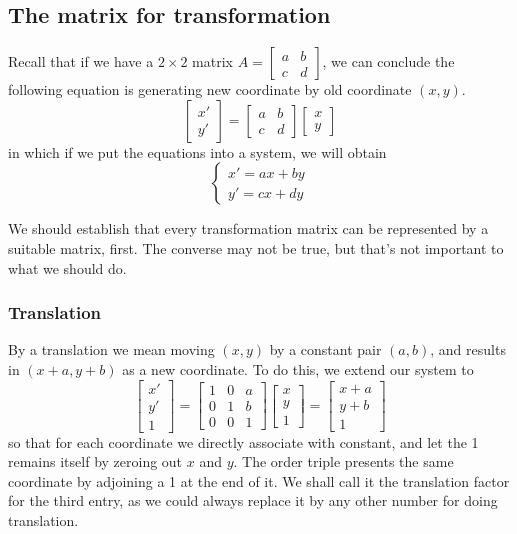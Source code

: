 \documentclass[12pt]{article}
\begin{document}
    \subsection*{The matrix for transformation}
    Recall that if we have a $2\times 2$ matrix $A=\begin{bmatrix}
        a&b\\c&d
    \end{bmatrix}$, we can conclude the following equation is generating new coordinate by old coordinate $(x,y)$. $$\begin{bmatrix}
        x'\\y'
    \end{bmatrix}=\begin{bmatrix}
        a&b\\c&d
    \end{bmatrix}\begin{bmatrix}
        x\\y
    \end{bmatrix}$$ in which if we put the equations into a system, we will obtain $$\begin{cases}
        x'=ax+by\\
        y'=cx+dy
    \end{cases}$$

    We should establish that every transformation matrix can be represented by a suitable matrix, first. The converse may not be true, but that's not important to what we should do.

    \subsubsection*{Translation}
    By a translation we mean moving $(x,y)$ by a constant pair $(a,b)$, and results in $(x+a,y+b)$ as a new coordinate. To do this, we extend our system to $$\begin{bmatrix}
        x'\\y'\\1
    \end{bmatrix}=\begin{bmatrix}
        1&0&a\\0&1&b\\0&0&1
    \end{bmatrix}\begin{bmatrix}
        x\\y\\1
    \end{bmatrix}=\begin{bmatrix}
        x+a\\y+b\\1
    \end{bmatrix}$$ so that for each coordinate we directly associate with constant, and let the 1 remains itself by zeroing out $x$ and $y$. The order triple presents the same coordinate by adjoining a 1 at the end of it. We shall call it the translation factor for the third entry, as we could always replace it by any other number for doing translation.
\end{document}
